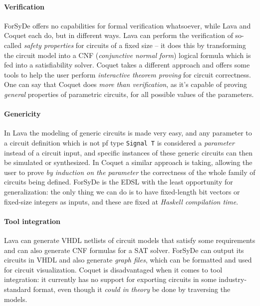     \paragraph{Verification}
        ForSyDe offers no capabilities for formal verification whatsoever, while Lava and Coquet
        each do, but in different ways. Lava can perform the verification of so-called \emph{safety
        properties} for circuits of a fixed size -- it does this by transforming the circuit model
        into a CNF (\emph{conjunctive normal form}) logical formula which is fed into a
        satisfiability solver. Coquet takes a different approach and offers some tools to help the
        user perform \emph{interactive theorem proving} for circuit correctness. One can say that
        Coquet does \emph{more than verification}, as it's capable of proving \emph{general}
        properties of parametric circuits, for all possible values of the parameters.

    \paragraph{Genericity}
        In Lava the modeling of generic circuits is made very easy, and any parameter to a circuit
        definition which is not pf type \texttt{Signal T} is considered a \emph{parameter} instead
        of a circuit input, and specific instances of these generic circuits can then be simulated
        or synthesized. In Coquet a similar approach is taking, allowing the user to prove \emph{by
        induction on the parameter} the correctness of the whole family of circuits being defined.
        ForSyDe is the EDSL with the least opportunity for generalization: the only thing we can do
        is to have fixed-length bit vectors or fixed-size integers as inputs, and these are fixed at
        \emph{Haskell compilation time}.

    \paragraph{Tool integration}
        Lava can generate VHDL netlists of circuit models that satisfy some requirements and can
        also generate CNF formulas for a SAT solver. ForSyDe can output its circuits in VHDL and
        also generate \emph{graph files}, which can be formatted and used for circuit visualization.
        Coquet is disadvantaged when it comes to tool integration: it currently has no support for
        exporting circuits in some industry-standard format, even though it \emph{could in theory}
        be done by traversing the models.


